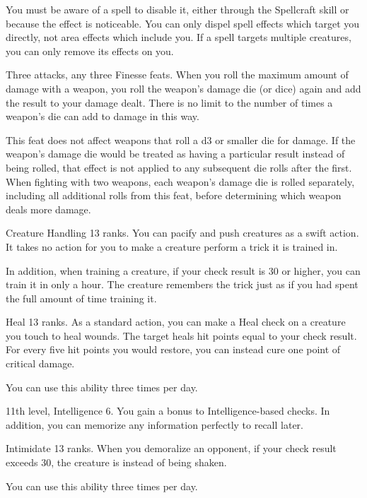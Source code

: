 You must be aware of a spell to disable it, either through the Spellcraft skill or because the effect is noticeable.
You can only dispel spell effects which target you directly, not area effects which include you.
If a spell targets multiple creatures, you can only remove its effects on you.

\featpre Three attacks, any three Finesse feats.
\featben When you roll the maximum amount of damage with a weapon, you roll the weapon's damage die (or dice) again and add the result to your damage dealt.
There is no limit to the number of times a weapon's die can add to damage in this way.

This feat does not affect weapons that roll a d3 or smaller die for damage.
If the weapon's damage die would be treated as having a particular result instead of being rolled, that effect is not applied to any subsequent die rolls after the first.
When fighting with two weapons, each weapon's damage die is rolled separately, including all additional rolls from this feat, before determining which weapon deals more damage.

\featpre Creature Handling 13 ranks.
\featben You can pacify and push creatures as a swift action.
It takes no action for you to make a creature perform a trick it is trained in.

In addition, when training a creature, if your check result is 30 or higher, you can train it in only a hour.
The creature remembers the trick just as if you had spent the full amount of time training it.

\featpre Heal 13 ranks.
\featben As a standard action, you can make a Heal check on a creature you touch to heal wounds.
The target heals hit points equal to your check result.
For every five hit points you would restore, you can instead cure one point of critical damage.

You can use this ability three times per day.

\featpre 11th level, Intelligence 6.
\featben You gain a  bonus to Intelligence-based checks.
In addition, you can memorize any information perfectly to recall later.

\featpre Intimidate 13 ranks.
\featben When you demoralize an opponent, if your check result exceeds 30, the creature is \panicked instead of being shaken.

You can use this ability three times per day.


